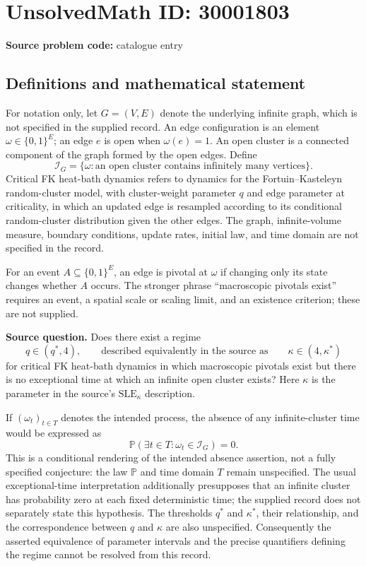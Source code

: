 \documentclass[11pt]{article}
\begin{document}
\section*{UnsolvedMath ID: 30001803}
\textbf{Source problem code:} catalogue entry
\subsection{Definitions and mathematical statement}
For notation only, let \(G=(V,E)\) denote the underlying infinite graph, which is not specified in the supplied record. An edge configuration is an element \(\omega\in\{0,1\}^{E}\); an edge \(e\) is open when \(\omega(e)=1\). An open cluster is a connected component of the graph formed by the open edges. Define
\[
\mathcal I_G=\{\omega:\text{an open cluster contains infinitely many vertices}\}.
\]
Critical FK heat-bath dynamics refers to dynamics for the Fortuin--Kasteleyn random-cluster model, with cluster-weight parameter \(q\) and edge parameter at criticality, in which an updated edge is resampled according to its conditional random-cluster distribution given the other edges. The graph, infinite-volume measure, boundary conditions, update rates, initial law, and time domain are not specified in the record.

For an event \(A\subseteq\{0,1\}^{E}\), an edge is pivotal at \(\omega\) if changing only its state changes whether \(A\) occurs. The stronger phrase ``macroscopic pivotals exist'' requires an event, a spatial scale or scaling limit, and an existence criterion; these are not supplied.

\textbf{Source question.} Does there exist a regime
\[
q\in(q^*,4),
\qquad\text{described equivalently in the source as}\qquad
\kappa\in(4,\kappa^*)
\]
for critical FK heat-bath dynamics in which macroscopic pivotals exist but there is no exceptional time at which an infinite open cluster exists? Here \(\kappa\) is the parameter in the source's \(\mathrm{SLE}_{\kappa}\) description.

If \((\omega_t)_{t\in T}\) denotes the intended process, the absence of any infinite-cluster time would be expressed as
\[
\mathbb P\!\left(\exists t\in T:\omega_t\in\mathcal I_G\right)=0.
\]
This is a conditional rendering of the intended absence assertion, not a fully specified conjecture: the law \(\mathbb P\) and time domain \(T\) remain unspecified. The usual exceptional-time interpretation additionally presupposes that an infinite cluster has probability zero at each fixed deterministic time; the supplied record does not separately state this hypothesis. The thresholds \(q^*\) and \(\kappa^*\), their relationship, and the correspondence between \(q\) and \(\kappa\) are also unspecified. Consequently the asserted equivalence of parameter intervals and the precise quantifiers defining the regime cannot be resolved from this record.
\end{document}
